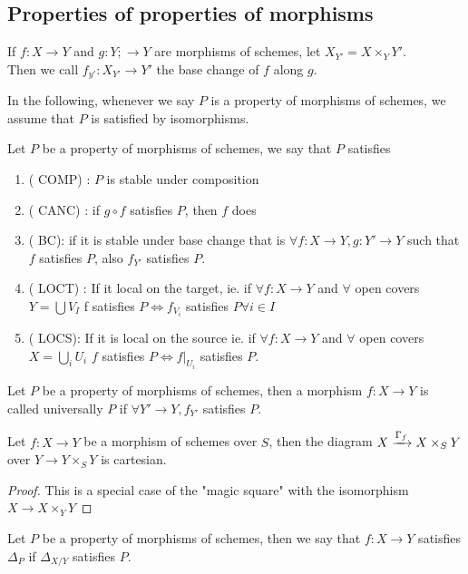 \documentclass[../main.tex]{subfiles}
\begin{document}
\subsection{Properties of properties of morphisms}
\begin{rmq}
If $f:X\to Y$ and $g:Y; \to Y$ are morphisms of schemes, let $X_{Y'} = X\times_Y Y'$.\\
Then we call $f_{y'} : X_{Y'} \to Y'$ the base change of $f$ along $g$.
\end{rmq}
\begin{rmq}
In the following, whenever we say $P$ is a property of morphisms of schemes, we assume that $P$ is satisfied by isomorphisms.
\end{rmq}
\begin{defn}
	Let $P$ be a property of morphisms of schemes, we say that $P$ satisfies 
	\begin{enumerate}
	\item ( COMP) : $P$ is stable under composition
	\item ( CANC) : if $g\circ f$ satisfies $P$, then $f$ does
	\item ( BC): if it is stable under base change that is $\forall f : X\to Y, g:Y' \to Y$ such that $f$ satisfies $P$, also $f_{Y'} $ satisfies $P$.
	\item ( LOCT) : If it local on the target, ie. if $\forall f:X\to Y$ and $\forall $ open covers $Y= \bigcup V_{I} $ f satisfies $P \iff f_{V_i} $ satisfies $P\forall i \in I$ 
	\item ( LOCS): If it is local on the source ie. if $\forall f:X\to Y$ and $\forall$ open covers $X= \bigcup_{i} U_i$ $f$ satisfies $P\iff f|_{U_i}$ satisfies $P$.
	\end{enumerate}
\end{defn}
\begin{defn}
Let $P$ be a property of morphisms of schemes, then a morphism $f:X\to Y$ is called universally $P$ if $\forall Y'\to Y, f_{Y'} $ satisfies $P$.
\end{defn}
\begin{lemma}
	Let $f:X\to Y$ be a morphism of schemes over $S$, then the diagram $X\xrightarrow{\Gamma_f} X\times_S Y$ over $Y \to Y\times_S Y$ is cartesian.
\end{lemma}
\begin{proof}
This is a special case of the "magic square" with the isomorphism $X\to X\times_Y Y $ 
\end{proof}
\begin{defn}
	Let $P$ be a property of morphisms of schemes, then we say that $f:X\to Y$ satisfies $\Delta_P$ if $\Delta_{X /Y} $ satisfies $P$.
\end{defn}
\end{document}
